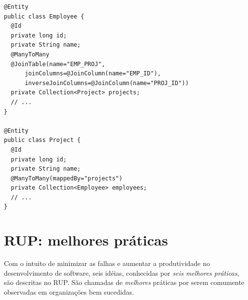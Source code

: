 \documentclass[
  10.5pt,				  %
	openright,			%
	twoside,			  %
  a5paper,
  chapter=TITLE,	%
	section=TITLE,	%
  hyphens,        %
	english,        %
	brazil          %
]{abntex2}
\begin{document}
\begin{lstlisting}[caption={Classes Employee e Project.}, label={alg:entity_employee_project}]
@Entity
public class Employee {
  @Id
  private long id;
  private String name;
  @ManyToMany
  @JoinTable(name="EMP_PROJ",
      joinColumns=@JoinColumn(name="EMP_ID"),
      inverseJoinColumns=@JoinColumn(name="PROJ_ID"))
  private Collection<Project> projects;
  // ...
}

@Entity
public class Project {
  @Id
  private long id;
  private String name;
  @ManyToMany(mappedBy="projects")
  private Collection<Employee> employees;
  // ...
}
\end{lstlisting}
%



\chapter{RUP: melhores práticas}\label{anexo:rup}

Com o intuito de minimizar as falhas e aumentar a produtividade no desenvolvimento de software, seis idéias, conhecidas por \emph{seis melhores práticas}, são descritas no RUP. São chamadas de \emph{melhores} práticas por serem comumente observadas em organizações bem sucedidas.
\end{document}
